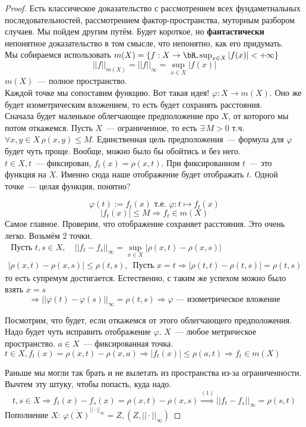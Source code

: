 \documentclass[document]{subfiles}
\begin{document}
\begin{proof}
    Есть классическое доказательство с рассмотрением всех фундаметнальных последовательностей, рассмотрением фактор-пространства, 
    муторным разбором случаев. Мы пойдем другим путём. 
    Будет короткое, но \textbf{фантастически}
    непонятное доказательство в том смысле, что непонятно, как его придумать. \\
    Мы собираемся использовать $m(X) = \{ f: X \rightarrow \bR, \sup_{x \in X} |f(x)| < + \infty \} $
    \[ ||f||_{m(X)} = ||f||_\infty = \sup_{x \in X} |f(x)| \]
    $m(X)$~--- полное пространство. \\
    Каждой точке мы сопоставим функцию. Вот такая идея!
    $\varphi: X \rightarrow m(X)$.
    Оно же будет изометрическим вложением, то есть будет сохранять расстояния.  \\
    Сначала будет маленькое облегчающее предположение про $X$, от которого мы потом откажемся.
    Пусть $X$~--- ограниченное, то есть $\exists \, M > 0$ т.ч. $\forall x,y \in X \, \rho(x,y) \leq M$.
    Единственная цель предположения~--- формула для $\varphi$ будет чуть проще. Вообще, можно было бы обойтись и без него. \\
    $t \in X, t$~--- фиксирован, $f_t(x) = \rho(x,t)$.
    При фиксированном $t$~--- это функция на $X$. Именно сюда наше отображение будет отображать $t$. Одной точке~--- целая функция, понятно?

    \[ \varphi(t) := f_t(x) \text{ т.е. } \varphi: t \mapsto f_t(x) \]
    \[ |f_t(x)| \leq M \Rightarrow f_t \in m(X) \]
    Самое главное. Проверим, что отображение сохраняет расстояния. Это очень легко. Возьмём 2 точки.
    \begin{gather*}
        \text{ Пусть } t, s \in X, \quad ||f_t - f_s||_\infty = \sup_{x \in X} |\rho(x,t) - \rho(x,s)|\\
        |\rho(x,t) - \rho(x,s) | \leq \rho(t,s), \, \text { Пусть } x = t \Rightarrow |\rho(t,t) - \rho(t,s) | = \rho(t,s)
    \end{gather*}
    то есть супремум достигается. Естественно, с таким же успехом можно было взять $x = s$
    \[ \Rightarrow  || \varphi(t) - \varphi(s)||_\infty = \rho(t,s) \Rightarrow \varphi \text{~--- изометрическое вложение} \]

    Посмотрим, что будет, если откажемся от этого облегчающего предположения. Надо будет чуть исправить отображение $\varphi$.
    $X$~--- любое метрическое пространство. $a \in X$~--- фиксированная точка.\\
    $t \in X, f_t(x) = \rho(x,t) - \rho(x,a) \Rightarrow |f_t(x)| \leq \rho(a,t) \Rightarrow f_t \in m(X) $

    Раньше мы могли так брать и не вылетать из пространства из-за ограниченности. Вычтем эту штуку, чтобы попасть, куда надо. \\
    \[ t,s \in X \Rightarrow f_t(x) - f_s(x) = \rho(x,t) - \rho(x,s) \stackrel{(1)}{\Rightarrow} 
        ||f_t - f_s||_\infty = \rho(s,t) 
        \]
    Пополнение $X$: $ \overline{\varphi(X)}^{|| \cdot ||_\infty} = Z, (Z, || \cdot ||_\infty) $
\end{proof}
\end{document}
